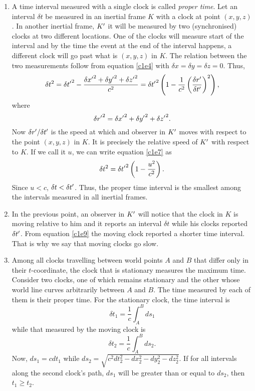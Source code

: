 \begin{enumerate}
\item A time interval measured with a single clock is called
\emph{proper time}. Let an interval $\delta t$ be measured in an inertial frame
$K$ with a clock at point $(x, y, z)$. In another inertial frame, $K^\prime$ it will
be measured by two (synchronised) clocks at two different locations. One of the
clocks will measure start of the interval and by the time the event at the end 
of the interval happens, a different clock will go past what is $(x, y, z)$ in
$K$. The relation between the two measurements follow from equation \eqref{c1e4}
with $\delta x = \delta y = \delta z = 0$. Thus,
\begin{equation}\label{c1e7}
\delta t^2 = \delta {t^\prime}^2 - \frac{\delta {x^\prime}^2 + \delta {y^\prime}^2 + \delta {z^\prime}^2}{c^2}
= \delta {t^\prime}^2\left(1 - \frac{1}{c^2}\left(\frac{\delta r^\prime}{\delta t^\prime}\right)^2\right),
\end{equation}
where
\begin{equation}\label{c1e8}
\delta {r^\prime}^2 = \delta {x^\prime}^2 + \delta {y^\prime}^2 + \delta {z^\prime}^2.
\end{equation}
Now $\delta r^\prime/\delta t^\prime$ is the speed at which and observer in $K^\prime$
moves with respect to the point $(x, y, z)$ in $K$. It is precisely the relative
speed of $K^\prime$ with respect to $K$. If we call it $u$, we can write equation
\eqref{c1e7} as
\begin{equation}\label{c1e9}
\delta t^2 = \delta {t^\prime}^2\left(1 - \frac{u^2}{c^2}\right).
\end{equation}
Since $u < c$, $\delta t < \delta t^\prime$. Thus, the proper time interval is the
smallest among the intervals measured in all inertial frames.

\item In the previous point, an observer in $K^\prime$ will notice that the clock
in $K$ is moving relative to him and it reports an interval $\delta t$ while his
clocks reported $\delta t^\prime$. From equation \eqref{c1e9} the moving clock
reported a shorter time interval. That is why we say that moving clocks go slow.

\item Among all clocks travelling between world points $A$ and $B$ that differ 
only in their $t$-coordinate, the clock that is stationary measures the maximum
time. Consider two clocks, one of which remains stationary and the other whose
world line curves arbitrarily between $A$ and $B$. The time measured by each of
them is their proper time. For the stationary clock, the time interval is
\begin{equation}\label{c1e10}
\delta t_1 = \frac{1}{c}\int_A^B ds_1
\end{equation}
while that measured by the moving clock is
\begin{equation}\label{c1e11}
\delta t_2 = \frac{1}{c}\int_A^B ds_2.
\end{equation}
Now, $ds_1 = cdt_1$ while $ds_2 = \sqrt{c^2dt_2^2 - dx_2^2 - dy_2^2 - dz_2^2}$.
If for all intervals along the second clock's path, $ds_1$ will be greater
than or equal to $ds_2$, then $t_1 \ge t_2$.


\end{enumerate}

